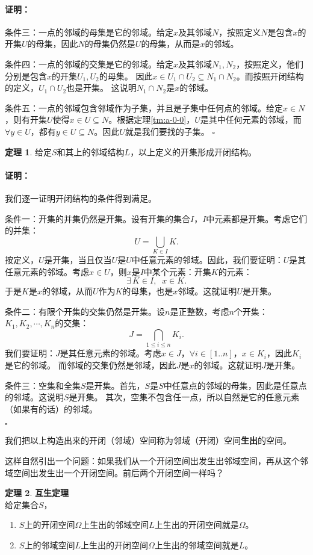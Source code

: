 \documentclass[12pt,UTF8]{ctexbook}
\theoremstyle{definition}
\newtheorem{tm}{定理}[section]
\theoremstyle{plain}
\renewenvironment{proof}{\paragraph{\textbf{证明：}}}{\hfill$\square$}
\begin{document}
\begin{appendix}
\begin{proof}
    条件三：一点的邻域的母集是它的邻域。给定$x$及其邻域$N$，按照定义$N$是包含$x$的开集$U$的母集，因此$N$的母集仍然是$U$的母集，从而是$x$的邻域。

    条件四：一点的邻域的交集是它的邻域。给定$x$及其邻域$N_1, N_2$，按照定义，他们分别是包含$x$的开集$U_1, U_2$的母集。
    因此$x\in U_1\cap U_2 \subseteq N_1\cap N_2 $。而按照开闭结构的定义，$U_1\cap  U_2$也是开集。
    这说明$N_1\cap N_2$是$x$的邻域。

    条件五：一点的邻域包含邻域作为子集，并且是子集中任何点的邻域。给定$x\in N$，则有开集$U$使得$x\in U \subseteq N$。根据定理\ref{tm:a-0-0}，$U$是其中任何元素的邻域，而$\forall y \in U$，都有$y\in U \subseteq N$。因此$U$就是我们要找的子集。
\end{proof}

\begin{tm}
    给定$S$和其上的邻域结构$L$，以上定义的开集形成开闭结构。
\end{tm}

\begin{proof}
    我们逐一证明开闭结构的条件得到满足。

    条件一：开集的并集仍然是开集。设有开集的集合$I$，$I$中元素都是开集。考虑它们的并集：
    $$ U = \bigcup_{K\in I} K. $$
    按定义，$U$是开集，当且仅当$U$是$U$中任意元素的邻域。因此，我们要证明：$U$是其任意元素的邻域。考虑$x\in U$，则$x$是$I$中某个元素：开集$K$的元素：
    $$ \exists \, K \in I, \;\; x \in K.$$
    于是$K$是$x$的邻域，从而$U$作为$K$的母集，也是$x$邻域。这就证明$U$是开集。

    条件二：有限个开集的交集仍然是开集。设$n$是正整数，考虑$n$个开集：$K_1, K_2, \cdots, K_n$的交集：
    $$ J = \bigcap_{1\leqslant i \leqslant n} K_i.$$
    我们要证明：$J$是其任意元素的邻域。考虑$x\in J$，$\forall i\in [1..n]$，$x\in K_i$，因此$K_i$是它的邻域。
    而邻域的交集仍然是邻域，因此$J$是$x$的邻域。这就证明$J$是开集。

    条件三：空集和全集$S$是开集。首先，$S$是$S$中任意点的邻域的母集，因此是任意点的邻域。这说明$S$是开集。
    其次，空集不包含任一点，所以自然是它的任意元素（如果有的话）的邻域。

\end{proof}

我们把以上构造出来的开闭（邻域）空间称为邻域（开闭）空间\textbf{生出}的空间。

这样自然引出一个问题：如果我们从一个开闭空间出发生出邻域空间，再从这个邻域空间出发生出一个开闭空间。前后两个开闭空间一样吗？

\begin{tm}{\textbf{互生定理}}
    \mbox{} \\
    给定集合$S$，
    \begin{enumerate}
        \item $S$上的开闭空间$\Omega$上生出的邻域空间$L$上生出的开闭空间就是$\Omega$。
        \item $S$上的邻域空间$L$上生出的开闭空间$\Omega$上生出的邻域空间就是$L$。
    \end{enumerate}
\end{tm}


\end{appendix}
\end{document}
